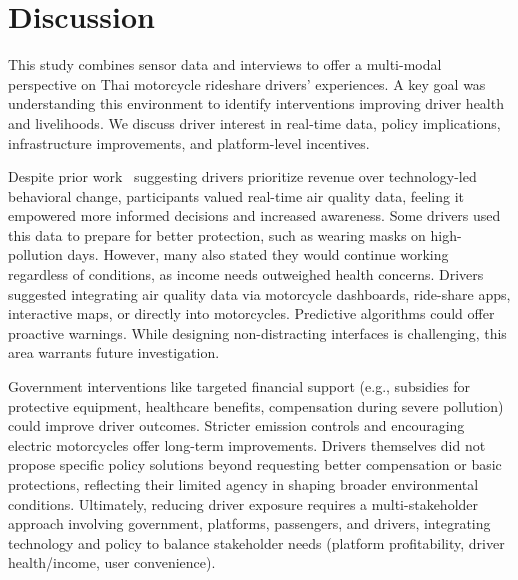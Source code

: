 \section{Discussion}

This study combines sensor data and interviews to offer a multi-modal perspective on Thai motorcycle rideshare drivers' experiences.
A key goal was understanding this environment to identify interventions improving driver health and livelihoods.
We discuss driver interest in real-time data, policy implications, infrastructure improvements, and platform-level incentives.




Despite prior work~\cite{tieanklin2024rideshare} suggesting drivers prioritize revenue over technology-led behavioral change, participants valued real-time air quality data, feeling it empowered more informed decisions and increased awareness.
Some drivers used this data to prepare for better protection, such as wearing masks on high-pollution days.
However, many also stated they would continue working regardless of conditions, as income needs outweighed health concerns. 
Drivers suggested integrating air quality data via motorcycle dashboards, ride-share apps, interactive maps, or directly into motorcycles.
Predictive algorithms could offer proactive warnings.
While designing non-distracting interfaces is challenging, this area warrants future investigation.



Government interventions like targeted financial support (e.g., subsidies for protective equipment, healthcare benefits, compensation during severe pollution) could improve driver outcomes.
Stricter emission controls and encouraging electric motorcycles offer long-term improvements.
Drivers themselves did not propose specific policy solutions beyond requesting better compensation or basic protections,
reflecting their limited agency in shaping broader environmental conditions.
Ultimately, reducing driver exposure requires a multi-stakeholder approach involving government, platforms, passengers, and drivers, integrating technology and policy to balance stakeholder needs (platform profitability, driver health/income, user convenience).

